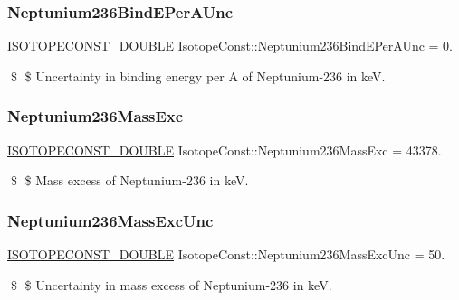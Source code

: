 \subsubsection{\texorpdfstring{Neptunium236\+Bind\+E\+Per\+A\+Unc}{Neptunium236BindEPerAUnc}}
{\footnotesize\ttfamily \mbox{\hyperlink{group___isotope_const-_macros_ga8f45a7272ce02c0b4c65c44636ed719a}{I\+S\+O\+T\+O\+P\+E\+C\+O\+N\+S\+T\+\_\+\+D\+O\+U\+B\+LE}} Isotope\+Const\+::\+Neptunium236\+Bind\+E\+Per\+A\+Unc = 0.}

\$ \$ Uncertainty in binding energy per A of Neptunium-\/236 in keV. \mbox{\label{group___isotope_const-_neptunium-_np236_ga4b8a0db769d6615ccd1f39f7f347f470}} 
\subsubsection{\texorpdfstring{Neptunium236\+Mass\+Exc}{Neptunium236MassExc}}
{\footnotesize\ttfamily \mbox{\hyperlink{group___isotope_const-_macros_ga8f45a7272ce02c0b4c65c44636ed719a}{I\+S\+O\+T\+O\+P\+E\+C\+O\+N\+S\+T\+\_\+\+D\+O\+U\+B\+LE}} Isotope\+Const\+::\+Neptunium236\+Mass\+Exc = 43378.}

\$ \$ Mass excess of Neptunium-\/236 in keV. \mbox{\label{group___isotope_const-_neptunium-_np236_ga434b8ca93311bbfeb8d10bd0c180c0b4}} 
\subsubsection{\texorpdfstring{Neptunium236\+Mass\+Exc\+Unc}{Neptunium236MassExcUnc}}
{\footnotesize\ttfamily \mbox{\hyperlink{group___isotope_const-_macros_ga8f45a7272ce02c0b4c65c44636ed719a}{I\+S\+O\+T\+O\+P\+E\+C\+O\+N\+S\+T\+\_\+\+D\+O\+U\+B\+LE}} Isotope\+Const\+::\+Neptunium236\+Mass\+Exc\+Unc = 50.}

\$ \$ Uncertainty in mass excess of Neptunium-\/236 in keV. \mbox{\label{group___isotope_const-_neptunium-_np236_gaa889d7c59eb08953e8ec33320de64dfe}} 
